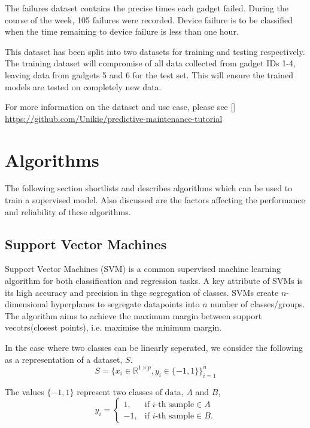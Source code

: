 \documentclass[a4paper,12pt]{report}
\newcommand{\R}{\mathbb{R}}
\begin{document}
The failures dataset contains the precise times each gadget failed. 
During the course of the week, 105 failures were recorded.
Device failure is to be classified when the time remaining to device failure is less than one hour.

This dataset has been split into two datasets for training and testing respectively.
The training dataset will compromise of all data collected from gadget IDs 1-4, leaving data from gadgets 5 and 6 for the test set.
This will ensure the trained models are tested on completely new data. 

For more information on the dataset and use case, please see []
\hyperlink{gitub repo}{https://github.com/Unikie/predictive-maintenance-tutorial}

\section{Algorithms}
The following section shortlists and describes algorithms which can be used to train a supervised model. 
Also discussed are the factors affecting the performance and reliability of these algorithms.

\subsection{Support Vector Machines}
Support Vector Machines (SVM) is a common supervised machine learning algorithm for both classification and regression tasks.
A key attribute of SVMs is its high accuracy and precision in thge segregation of classes.
SVMs create $n$-dimensional hyperplanes to segregate datapoints into $n$ number of classes/groups. 
The algorithm aims to achieve the maximum margin between support vecotrs(closest points), i.e. maximise the minimum margin.

In the case where two classes can be linearly seperated, we consider the following as a representation of a dataset, $S$.
\begin{equation}
    S = \Big\{x_i \in \R^{1 \times p}, y_i \in \{-1, 1\}\Big\}^n_{i=1}
\end{equation}

The values $\{-1, 1\}$ represent two classes of data, $A$ and $B$,
\begin{equation}
    y_i = \begin{cases}
        1, & \text{if $i$} \text{-th sample} \in  A\\
        -1, & \text{if $i$} \text{-th sample} \in  B.
    \end{cases}
\end{equation}
\end{document}
